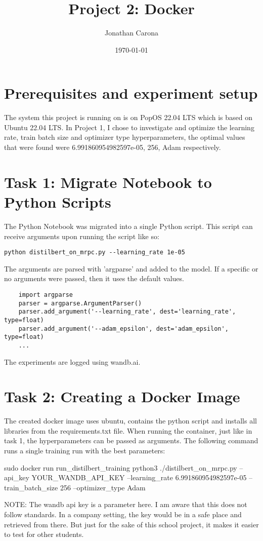 \documentclass{article}
\title{Project 2: Docker}
\author{Jonathan Carona}
\date{\today}
\begin{document}
\section{Prerequisites and experiment setup}
The system this project is running on is on PopOS 22.04 LTS which is
based on Ubuntu 22.04 LTS. In Project 1, I chose to investigate and optimize the learning rate,
train batch size and optimizer type hyperparameters, the optimal values that were found were
6.991860954982597e-05, 256, Adam respectively.

\section{Task 1: Migrate Notebook to Python Scripts}
The Python Notebook was migrated into a single Python script. This script can receive arguments upon running the script like so:

\verb!python distilbert_on_mrpc.py --learning_rate 1e-05!

The arguments are parsed with 'argparse' and added to the model. If a specific or no arguments were passed, then it uses the default values.
\begin{lstlisting}
    import argparse
    parser = argparse.ArgumentParser()
    parser.add_argument('--learning_rate', dest='learning_rate', type=float)
    parser.add_argument('--adam_epsilon', dest='adam_epsilon', type=float)
    ...
    \end{lstlisting}

The experiments are logged using wandb.ai.

\section{Task 2: Creating a Docker Image}
The created docker image uses ubuntu, contains the python script and installs all libraries from the requirements.txt file.
When running the container, just like in task 1, the hyperparameters can be passed as arguments. 
The following command runs a single training run with the best parameters:

\begin{spverbatim}
    sudo docker run run_distilbert_training python3 ./distilbert_on_mrpc.py --api_key YOUR_WANDB_API_KEY --learning_rate 6.991860954982597e-05 --train_batch_size 256 --optimizer_type Adam    
    \end{spverbatim}

NOTE: The wandb api key is a parameter here. I am aware that this does not follow standards. In a company setting, the key would be in a safe place and retrieved from there. But just for the sake of this school project, it makes it easier to test for other students.
\end{document}
